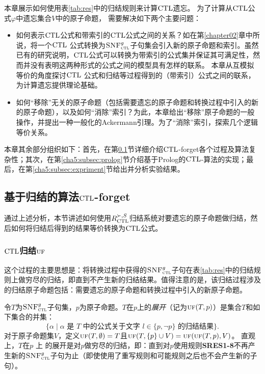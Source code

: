本章展示如何使用表\ref{tab:res}中的归结规则来计算$\textrm{CTL}$遗忘。
为了计算从$\textrm{CTL}$公式$\varphi$中遗忘集合$V$中的原子命题，
需要解决如下两个主要问题：
\begin{itemize}
	\item[(1)] 如何表示$\textrm{CTL}$公式和带索引的$\textrm{CTL}$公式之间的关系？如在第\ref{chapter02}章中所说，将一个$\textrm{CTL}$ 公式转换为${\textsc{SNF}_{\textsc{ctl}}^g}$子句集会引入新的原子命题和索引。虽然已有的研究说明，$\textrm{CTL}$公式可以转换为带索引的公式集并保证其可满足性，然而并没有表明这两种形式的公式之间的模型具有怎样的联系。
	本章从互模拟等价的角度探讨$\textrm{CTL}$ 公式和归结等过程得到的（带索引）公式之间的联系，为计算遗忘提供理论基础。
	\item[(2)] 如何“移除”无关的原子命题（包括需要遗忘的原子命题和转换过程中引入的新的原子命题），以及如何“消除”索引？为此，本章给出“移除”原子命题的一般操作，并提出一种一般化的Ackermann引理。为了“消除”索引，探索几个逻辑等价关系。
\end{itemize}


本章其余部分组织如下：首先，在第\ref{cha5:subsec:resf}节详细介绍$\textrm{CTL}$-forget各个过程及算法复杂性；其次，在第\ref{cha5:subsec:prolog}节介绍基于Prolog的$\textrm{CTL}$-算法的实现；最后，在第\ref{cha5:subsec:expriment}节给出并分析实验结果。
\subsection{基于归结的算法$\textrm{CTL}$-forget}
\label{cha5:subsec:resf}
通过上述分析，本节讲述如何使用$R_{\textrm{CTL}}^{\succ,S}$归结系统对要遗忘的原子命题做归结，然后如何将归结后得到的结果等价转换为$\textrm{CTL}$公式。
\subsubsection{$\textrm{CTL}$归结$\textsc{uf}$}


这个过程的主要思想是：将转换过程中获得的${\textsc{SNF}_{\textsc{ctl}}^g}$子句在表\ref{tab:res}中的归结规则上做穷尽的归结，即直到不产生新的归结结果。值得注意的是，该归结过程涉及的归结原子命题包括：需要遗忘的原子命题和转换过程中引入的新原子命题。

令$T$为${\textsc{SNF}_{\textsc{ctl}}^g}$子句集，$p$为原子命题。$T$在$p$上的\emph{展开}（记为$\textsc{uf}(T,p)$）是集合$T$和如下集合的并集：
\[\{\alpha\mid \mbox{$\alpha$ 是 $T$ 中的公式关于文字 $l\in\{p,\neg p\}$ 的归结结果}\}.  \]
对于原子命题集$V$，定义$\textsc{uf}(T,\emptyset)=T$且$\textsc{uf}(T,\{p\}\cup V)=\textsc{uf}(\textsc{uf}(T,p), V)$。
直观上，$T$在$p$ 上 的展开是对$p$做穷尽的归结，即：直到对$p$使用规则{\bf SRES1-8}不再产生新的${\textsc{SNF}_{\textsc{ctl}}^g}$子句为止（即使使用了重写规则和可能规则之后也不会产生新的子句）。


